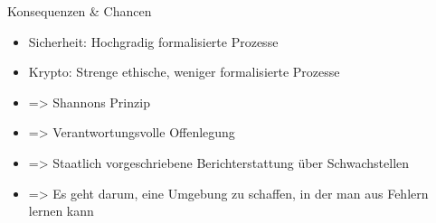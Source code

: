 \begin{frame}{Konsequenzen \& Chancen}
  \begin{itemize}
    \item  Sicherheit: Hochgradig formalisierte Prozesse
    \item  Krypto: Strenge ethische, weniger formalisierte Prozesse 
    \item  => Shannons Prinzip %
    \item  => Verantwortungsvolle Offenlegung
    \item  => Staatlich vorgeschriebene Berichterstattung über Schwachstellen
    \item  => Es geht darum, eine Umgebung zu schaffen, in der man aus Fehlern lernen kann
  \end{itemize}
\end{frame}
